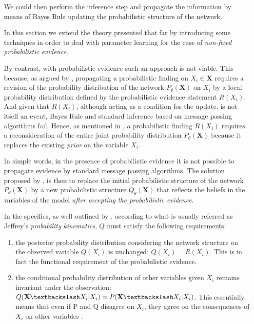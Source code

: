 \documentclass[11pt]{article}
\begin{document}
\begin{article}
We could then perform the inference step and propagate the
information by means of Bayes Rule updating the probabilistic
structure of the network.

In this section we extend the theory presented that far by
introducing some techniques in order to deal with parameter learning
for the case of \emph{non-fixed probabilistic evidence}.

By contrast, with probabilistic evidence such an approach is not
viable. This because, as argued by \cite{PENG_2010}, propagating a
probabilistic finding on \(X_i \in \textbf{X}\) requires a revision of
the probability distribution of the network \(P_\theta(\textbf{X})\)
on \(X_i\) by a local probability distribution defined by the
probabilistic evidence statement \(R(X_i)\). And given that \(R(X_i)\),
although acting as a condition for the update, is not itself an
event, Bayes Rule and standard inference based on message passing
algorithms fail. Hence, as mentioned in \cite{Mrad_2015}, a
probabilistic finding \(R(X_i)\) requires a reconsideration of the
entire joint probability distribution \(P_\theta(\textbf{X})\) because
it replaces the existing \emph{prior} on the variable \(X_i\).

In simple words, in the presence of probabilistic evidence it is not
possible to propagate evidence by standard message passing
algorithms. The solution proposed by \cite{jeffrey1990logic}, is then
to replace the initial probabilistic structure of the network
\(P_\theta(\textbf{X})\) by a new probabilistic structure
\(Q_\theta(\textbf{X})\) that reflects the beliefs in the variables of
the model \emph{after accepting the probabilistic evidence}.

In the specifics, as well outlined by \cite{Mrad_2015}, according to
what is usually referred as Jeffrey's \emph{probability kinematics}, \(Q\)
must satisfy the following requirements:

\begin{enumerate}
\item the posterior probability distribution considering the network
structure on the observed variable \(Q(X_i)\) is unchanged: \(Q(X_i)
     = R(X_i)\). This is in fact the functional requirement of the
probabilistic evidence.

\item the conditional probability distribution of other variables given
\(X_i\) remains invariant under the observation: \(Q(\textbf{X}
     \textbackslash X_i | X_i) = P (\textbf{X} \textbackslash X_i |
     X_i)\). This essentially means that even if P and Q disagree on
\(X_i\), they agree on the consequences of \(X_i\) on other variables
\cite{Mrad_2015}.
\end{enumerate}


\end{article}
\end{document}
